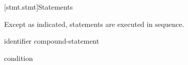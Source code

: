 [stmt.stmt]{Statements}%



\pnum
Except as indicated, statements are executed in sequence.

\begin{bnf}
\br
     identifier  compound-statement \atomicc\br

 \atomicc\br
     condition \terminal{)} \atomicc

\end{bnf}
